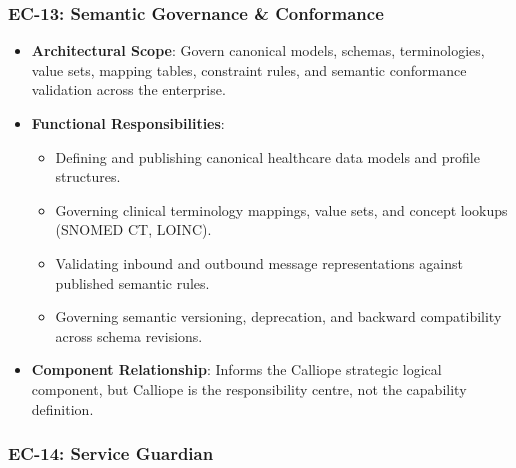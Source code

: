 \label{rad:enterprise:215}
\subsubsection*{EC-13: Semantic Governance \& Conformance}
\label{rad:enterprise:216}

\begin{itemize}

\item 
\textbf{Architectural Scope}: Govern canonical models, schemas, terminologies, value sets, mapping tables, constraint rules, and semantic conformance validation across the enterprise.



\item 
\textbf{Functional Responsibilities}:


\begin{itemize}

\item 
Defining and publishing canonical healthcare data models and profile structures.



\item 
Governing clinical terminology mappings, value sets, and concept lookups (SNOMED CT, LOINC).



\item 
Validating inbound and outbound message representations against published semantic rules.



\item 
Governing semantic versioning, deprecation, and backward compatibility across schema revisions.



\end{itemize}


\item 
\textbf{Component Relationship}: Informs the Calliope strategic logical component, but Calliope is the responsibility centre, not the capability definition.



\end{itemize}
\label{rad:enterprise:224}
\subsubsection*{EC-14: Service Guardian}
\label{rad:enterprise:226}


